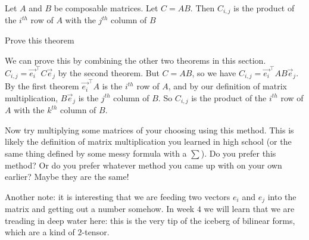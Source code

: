 \documentclass{ximera}
\begin{document}
\begin{theorem}
	Let $A$ and $B$ be composable matrices.  Let $C=AB$.  Then $C_{i,j}$ is the product of the $i^{th}$ row of $A$ with the $j^{th}$ column of $B$
\end{theorem}

Prove this theorem
\begin{free-response}
	We can prove this by combining the other two theorems in this section.  $C_{i,j} = \vec{e_i}^\top C \vec{e}_j$ by the second theorem.  But $C = AB$, so we have 
	$C_{i,j} = \vec{e_i}^\top AB\vec{e}_j$.  By the first theorem $\vec{e_i}^\top A$ is the $i^{th}$ row of $A$, and by our definition of matrix multiplication, 
	$B\vec{e}_j$ is the $j^{th}$ column of $B$. So $C_{i,j}$ is the product of the $i^{th}$ row of $A$ with the $k^{th}$ column of $B$.
\end{free-response}

Now try multiplying some matrices of your choosing using this method.  This is likely the definition of matrix multiplication you learned in high school (or the same thing
defined by some messy formula with a $\sum$).  Do you prefer this method?  Or do you prefer whatever method you came up with on your own earlier?  
Maybe they are the same!

Another note:  it is interesting that we are feeding two vectors $e_i$ and $e_j$ into the matrix and getting out a number somehow.  
In week $4$ we will learn that we are treading in deep water here:  this is the very tip of the iceberg of bilinear forms, which are a kind of $2$-tensor.
  
	
\end{document}
